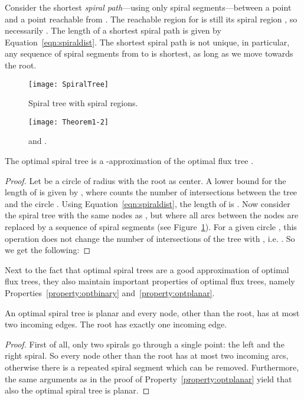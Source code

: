\documentclass{journalA4}
\begin{document}
Consider the shortest \emph{spiral path}---using only spiral segments---between a point~ and a point  reachable from . The reachable region for  is still its spiral region , so necessarily . The length of a shortest spiral path is given by Equation~\ref{eqn:spiraldist}. The shortest spiral path is not unique, in particular, any sequence of spiral segments from  to  is shortest, as long as we move towards the root.

\begin{figure}[b]
    \hfill
    \begin{minipage}[t]{.45\textwidth}
        \centering
        \texttt{[image: SpiralTree]}
        \caption{Spiral tree with spiral regions.}
        \label{fig:SpiralTree}
    \end{minipage}
    \hfill
    \begin{minipage}[t]{.5\textwidth}
        \centering
        \texttt{[image: Theorem1-2]}
        \caption{ and .}
        \label{fig:Theorem1}
    \end{minipage}
    \hfill\hfill
\end{figure}

\begin{theorem}
\label{thm:fluxapprox}
The optimal spiral tree  is a -approximation of the optimal flux tree .
\end{theorem}
\begin{proof}
Let  be a circle of radius  with the root  as center. A lower bound for the length of  is given by , where  counts the number of intersections between the tree  and the circle . Using Equation~\ref{eqn:spiraldist}, the length of  is . Now consider the spiral tree  with the same nodes as , but where all arcs between the nodes are replaced by a sequence of spiral segments (see Figure~\ref{fig:Theorem1}). For a given circle , this operation does not change the number of intersections of the tree with , i.e. . So we get the following:

\end{proof}
Next to the fact that optimal spiral trees are a good approximation of optimal flux trees, they also maintain important properties of optimal flux trees, namely Properties~\ref{property:optbinary} and~\ref{property:optplanar}.

\begin{lemma}
\label{lem:spiralplandeg}
An optimal spiral tree is planar and every node, other than the root, has at most two incoming edges. The root has exactly one incoming edge.
\end{lemma}
\begin{proof}
First of all, only two spirals go through a single point: the left and the right spiral. So every node other than the root  has at most two incoming arcs, otherwise there is a repeated spiral segment which can be removed. Furthermore, the same arguments as in the proof of Property~\ref{property:optplanar} yield that also the optimal spiral tree is planar.
\end{proof}
\end{document}
